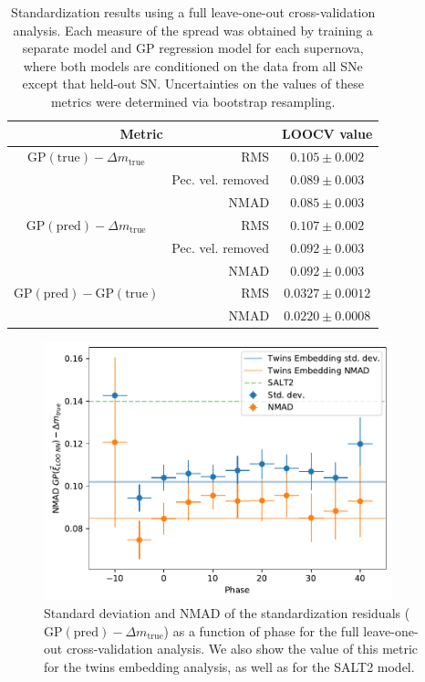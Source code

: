 \begin{table}[htbp]
    \centering
    \begin{tabular}{crc}\toprule
        \multicolumn{2}{c}{Metric} & LOOCV value \\\midrule
        $\textrm{GP}(\textrm{true}) - \Delta m_\textrm{true}$ & RMS & $0.105 \pm 0.002$ \\
        & Pec. vel. removed & $0.089 \pm 0.003$\\
        & NMAD & $0.085 \pm 0.003$ \\
        $\textrm{GP}(\textrm{pred}) - \Delta m_\textrm{true}$ & RMS & $0.107 \pm 0.002$ \\
        & Pec. vel. removed & $0.092 \pm 0.003$ \\
        & NMAD & $0.092 \pm 0.003$\\
        $\textrm{GP}(\textrm{pred}) - \textrm{GP}(\textrm{true})$ & RMS & $0.0327\pm 0.0012$\\
        & NMAD & $0.0220 \pm 0.0008$\\
    \bottomrule
    \end{tabular}
    \caption{Standardization results using a full leave-one-out cross-validation analysis. Each measure of the spread was obtained by training a separate \stoe{} model and GP regression model for each supernova, where both models are conditioned on the data from all SNe except that held-out SN. Uncertainties on the values of these metrics were determined via bootstrap resampling.}
    \label{tab:standardization_loo_results}
\end{table}

\begin{figure}
    \centering
    \includegraphics[width=0.9\textwidth]{figures/nn_twins/stand_err_vs_phase_loo.pdf}
    \caption{Standard deviation and NMAD of the standardization residuals ($\textrm{GP}(\textrm{pred}) - \Delta m_\textrm{true}$) as a function of phase for the full leave-one-out cross-validation analysis. We also show the value of this metric for the twins embedding analysis, as well as for the SALT2 model.}
    \label{fig:stand_err_vs_phase_loo}
\end{figure}

